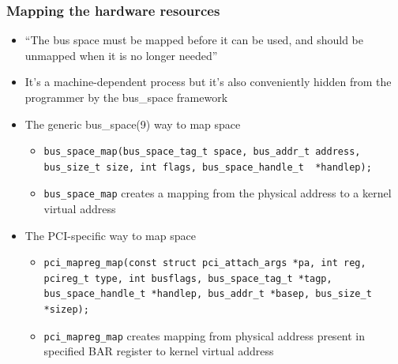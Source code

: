 \documentclass[dvipsnames,table]{beamer}
\begin{document}
\begin{frame}[fragile]
\frametitle{Mapping the hardware resources}

\begin{itemize}
	\item ``The bus space must be mapped before it can be used, and should be unmapped       when it is no longer needed''
\normalsize
	\item It's a machine-dependent process but it's also conveniently hidden from the programmer by the bus\_space framework
	\item The generic bus\_space(9) way to map space
\begin{itemize}
	\scriptsize
	\item
\begin{verbatim}
bus_space_map(bus_space_tag_t space, bus_addr_t address, 
bus_size_t size, int flags, bus_space_handle_t  *handlep);
\end{verbatim}
	\normalsize
	\item {\tt bus\_space\_map} creates a mapping from the physical address to a kernel virtual address
\end{itemize}
	\item The PCI-specific way to map space
\begin{itemize}
	\scriptsize
	\item
\begin{verbatim}
pci_mapreg_map(const struct pci_attach_args *pa, int reg, 
pcireg_t type, int busflags, bus_space_tag_t *tagp, 
bus_space_handle_t *handlep, bus_addr_t *basep, bus_size_t *sizep);
\end{verbatim}
	\normalsize
	\item {\tt pci\_mapreg\_map} creates mapping from physical address present in specified BAR register to kernel virtual address
\end{itemize}
\end{itemize}
\end{frame}
\end{document}
